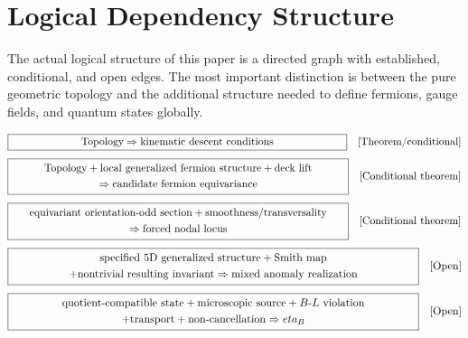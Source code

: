 \documentclass[11pt]{article}
\theoremstyle{canonmath}
\theoremstyle{canonpostulate}
\theoremstyle{canonclaim}
\def\eta{eta}%
\begin{document}

\newpage
\section*{Logical Dependency Structure}
The actual logical structure of this paper is a directed graph with established, conditional, and open edges. The most important distinction is between the pure geometric topology and the additional structure needed to define fermions, gauge fields, and quantum states globally.

\begin{equation*}
\boxed{\makebox[11cm][c]{$\text{Topology} \Rightarrow \text{kinematic descent conditions}$}}
\quad [\text{Theorem/conditional}]
\end{equation*}
\begin{equation*}
\boxed{\makebox[11cm][c]{$\begin{gathered}
\text{Topology} + \text{local generalized fermion structure} + \text{deck lift} \\
\Rightarrow \text{candidate fermion equivariance}
\end{gathered}$}}
\quad [\text{Conditional theorem}]
\end{equation*}
\begin{equation*}
\boxed{\makebox[11cm][c]{$\begin{gathered}
\text{equivariant orientation-odd section} + \text{smoothness/transversality} \\
\Rightarrow \text{forced nodal locus}
\end{gathered}$}}
\quad [\text{Conditional theorem}]
\end{equation*}
\begin{equation*}
\boxed{\makebox[13cm][c]{$\begin{gathered}
\text{specified 5D generalized structure} + \text{Smith map} \\
+ \text{nontrivial resulting invariant} \Rightarrow \text{mixed anomaly realization}
\end{gathered}$}}
\quad [\text{Open}]
\end{equation*}
\begin{equation*}
\boxed{\makebox[13cm][c]{$\begin{gathered}
\text{quotient-compatible state} + \text{microscopic source} + B\text{-}L \text{ violation} \\
+ \text{transport} + \text{non-cancellation} \Rightarrow \eta_B
\end{gathered}$}}
\quad [\text{Open}]
\end{equation*}
\end{document}
